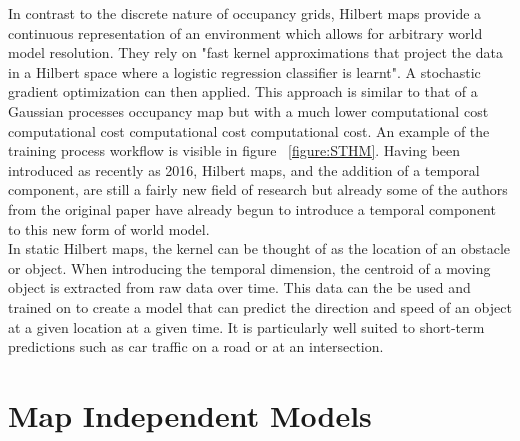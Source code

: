   In contrast to the discrete nature of occupancy grids, Hilbert maps provide a
  continuous representation of an environment which allows for arbitrary world
  model resolution. They rely on "fast kernel approximations that project the
  data in a Hilbert space where a logistic regression classifier is learnt".
  A stochastic gradient optimization can then applied. This approach is similar to
  that of a Gaussian processes occupancy map but with a much lower computational
  cost computational cost computational cost computational cost. An example
  of the training process workflow is visible in figure ~\ref{figure:STHM}. Having been
  introduced as recently as 2016, Hilbert maps, and the addition of a temporal
  component, are still a fairly new field of research but already some of the
  authors from the original paper have already begun to introduce a temporal
  component to this new form of world model. \cite{Ramos2016, Senanayake2016} \\

  In static Hilbert maps, the kernel can be thought of as the location of an
  obstacle or object. When introducing the temporal dimension, the centroid of a
  moving object is extracted from raw data over time. This data can the be used
  and trained on to create a model that can predict the direction and speed of an
  object at a given location at a given time. It is particularly well suited to
  short-term predictions such as car traffic on a road or at an intersection.
  \cite{Senanayake2016} \cite{Senanayake2017}

  \section{ Map Independent Models }

